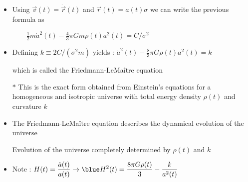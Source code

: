 \Tr
\begin{itemize}
\item Using {\blue $\vec{v}(t)=\dot{\vec{r}}(t)$} and {\blue $\vec{r}(t)=a(t)\sigma$}
      we can write the previous formula as
\item[] $\qquad \frac{1}{2}m\dot{a}^{2}(t)-\frac{4}{3}\pi Gm\rho(t)a^{2}(t)=C/\sigma^{2}$
\item Defining $k \equiv 2C/(\sigma^{2}m)$ yields :  $\dot{a}^{2}(t)-\frac{8}{3}\pi G\rho(t)a^{2}(t)=k$
\item[] which is called the {\blue Friedmann-LeMa\^{i}tre equation}
\item[] \begin{center}
        {\red {}}
        \end{center}
\item[$\ast$] This is the exact form obtained from Einstein's equations for a homogeneous and isotropic
              universe with {\blue total energy density $\rho(t)$} and {\blue curvature $k$}
\item The Friedmann-LeMa\^{i}tre equation describes the dynamical evolution of the universe
\item[] {\red Evolution of the universe completely determined by $\rho(t)$ and $k$}
\item Note : $\displaystyle H(t)=\frac{\dot{a}(t)}{a(t)} \rightarrow
              {\blue H^{2}(t)=\frac{8\pi G\rho(t)}{3}-\frac{k}{a^{2}(t)}}$
\end{itemize}